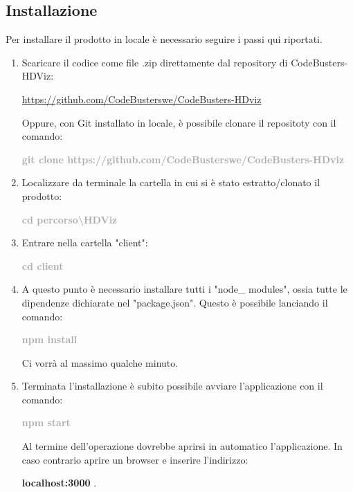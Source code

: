 \subsection{Installazione}
Per installare il prodotto in locale è necessario seguire i passi qui riportati.
\begin{enumerate}
	\item Scaricare il codice come file .zip direttamente dal repository di CodeBusters-HDViz:
		\begin{center}
			\textcolor{blue}{\url{https://github.com/CodeBusterswe/CodeBusters-HDviz}}
		\end{center}	
	Oppure, con Git installato in locale, è possibile clonare il repositoty con il comando:
		\begin{center}
			\textcolor{darkgray}{\textbf{git clone https://github.com/CodeBusterswe/CodeBusters-HDviz}}
		\end{center}
      
	\item Localizzare da terminale la cartella in cui si è stato estratto/clonato il prodotto:  
		\begin{center}
			\textcolor{darkgray}{\textbf{cd percorso\textbackslash HDViz}}
 		\end{center}	
	\item Entrare nella cartella "client":
		\begin{center}
			\textcolor{darkgray}{\textbf{cd client}}
 		\end{center}	     
	\item A questo punto è necessario installare tutti i "node\_ modules", ossia tutte le dipendenze dichiarate nel "package.json". Questo è possibile lanciando il comando:
		\begin{center}
			\textcolor{darkgray}{\textbf{npm install}}
 		\end{center}		
	Ci vorrà al massimo qualche minuto. 
	\item Terminata l'installazione è subito possibile avviare l'applicazione con il comando:
		\begin{center}
			\textcolor{darkgray}{\textbf{npm start}}
 		\end{center}
	Al termine dell'operazione dovrebbe aprirsi in automatico l'applicazione. In caso contrario aprire un browser e inserire l'indirizzo:
	\begin{center}
		\textbf{localhost:3000} .
	\end{center}		
\end{enumerate}
  			